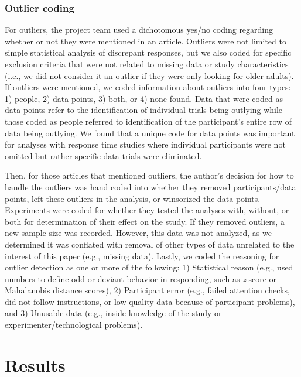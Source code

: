 \documentclass[english,,man]{apa6}
\begin{document}
\hypertarget{outlier-coding}{%
\subsubsection{Outlier coding}\label{outlier-coding}}

For outliers, the project team used a dichotomous yes/no coding regarding whether or not they were mentioned in an article. Outliers were not limited to simple statistical analysis of discrepant responses, but we also coded for specific exclusion criteria that were not related to missing data or study characteristics (i.e., we did not consider it an outlier if they were only looking for older adults). If outliers were mentioned, we coded information about outliers into four types: 1) people, 2) data points, 3) both, or 4) none found. Data that were coded as data points refer to the identification of individual trials being outlying while those coded as people referred to identification of the participant's entire row of data being outlying. We found that a unique code for data points was important for analyses with response time studies where individual participants were not omitted but rather specific data trials were eliminated.

Then, for those articles that mentioned outliers, the author's decision for how to handle the outliers was hand coded into whether they removed participants/data points, left these outliers in the analysis, or winsorized the data points. Experiments were coded for whether they tested the analyses with, without, or both for determination of their effect on the study. If they removed outliers, a new sample size was recorded. However, this data was not analyzed, as we determined it was conflated with removal of other types of data unrelated to the interest of this paper (e.g., missing data). Lastly, we coded the reasoning for outlier detection as one or more of the following: 1) Statistical reason (e.g., used numbers to define odd or deviant behavior in responding, such as \emph{z}-score or Mahalanobis distance scores), 2) Participant error (e.g., failed attention checks, did not follow instructions, or low quality data because of participant problems), and 3) Unusable data (e.g., inside knowledge of the study or experimenter/technological problems).

\hypertarget{results}{%
\section{Results}\label{results}}
\end{document}

